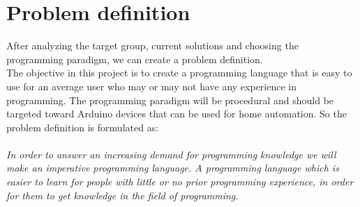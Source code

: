 \section{Problem definition}
After analyzing the target group, current solutions and choosing the programming paradigm, we can create a problem definition. \\ The objective in this project is to create a programming language that is easy to use for an average user who may or may not have any experience in programming. The programming paradigm will be procedural and should be targeted toward Arduino devices that can be used for home automation. So the problem definition is formulated as:\\
\\
\textit{In order to answer an increasing demand for programming knowledge we will make an imperative programming language. A programming language which is easier to learn for people with little or no prior programming experience, in order for them to get knowledge in the field of programming.}

